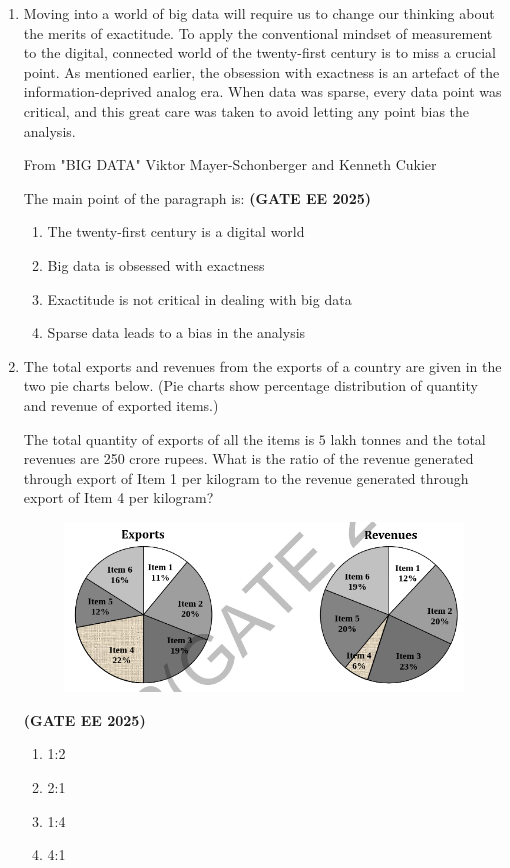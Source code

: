 \documentclass[journal,12pt,onecolumn]{IEEEtran}
\theoremstyle{remark}
\begin{document}
\begin{enumerate}
    \item Moving into a world of big data will require us to change our thinking about the merits of exactitude. To apply the conventional mindset of measurement to the digital, connected world of the twenty-first century is to miss a crucial point. As mentioned earlier, the obsession with exactness is an artefact of the information-deprived analog era. When data was sparse, every data point was critical, and this great care was taken to avoid letting any point bias the analysis.  

    From "BIG DATA" Viktor Mayer-Schonberger and Kenneth Cukier 

    The main point of the paragraph is:  
\hfill \textbf{(GATE EE 2025)}
    \begin{enumerate} 
        \item The twenty-first century is a digital world  
        \item Big data is obsessed with exactness  
        \item Exactitude is not critical in dealing with big data  
        \item Sparse data leads to a bias in the analysis  
    \end{enumerate}

    \item The total exports and revenues from the exports of a country are given in the two pie charts below.  
    (Pie charts show percentage distribution of quantity and revenue of exported items.)  

    The total quantity of exports of all the items is $5$ lakh tonnes and the total revenues are 250 crore rupees. What is the ratio of the revenue generated through export of Item 1 per kilogram to the revenue generated through export of Item 4 per kilogram?  
    \begin{figure}[H]
        \centering
        \includegraphics[width=0.5\linewidth]{figs/fig1.png}
        \caption{ }
        \label{fig1}
    \end{figure}
\hfill \textbf{(GATE EE 2025)}
    \begin{enumerate} 
        \item 1:2
        \item 2:1
        \item 1:4
        \item 4:1
    \end{enumerate}


\end{enumerate}
\end{document}
